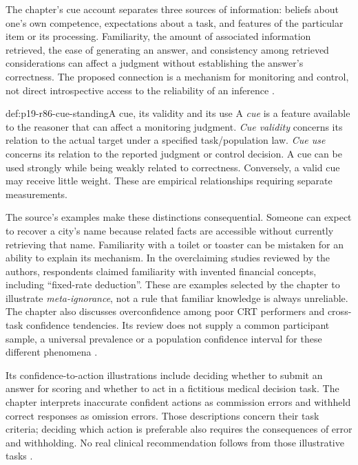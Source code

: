 The chapter's cue account separates three sources of information: beliefs
about one's own competence, expectations about a task, and features of the
particular item or its processing. Familiarity, the amount of associated
information retrieved, the ease of generating an answer, and consistency
among retrieved considerations can affect a judgment without establishing
the answer's correctness. The proposed connection is a mechanism for
monitoring and control, not direct introspective access to the reliability
of an inference \cite[pp.~518--520]{ThompsonElqayamAckerman2021MetaReasoning}.

\begin{hbdefinition}{def:p19-r86-cue-standing}{A cue, its validity and its use}
A \emph{cue} is a feature available to the reasoner that can affect a
monitoring judgment. \emph{Cue validity} concerns its relation to the actual
target under a specified task/population law. \emph{Cue use} concerns its
relation to the reported judgment or control decision. A cue can be used
strongly while being weakly related to correctness. Conversely, a valid cue
may receive little weight. These are empirical relationships requiring
separate measurements.
\end{hbdefinition}

The source's examples make these distinctions consequential. Someone can
expect to recover a city's name because related facts are accessible without
currently retrieving that name. Familiarity with a toilet or toaster can be
mistaken for an ability to explain its mechanism. In the overclaiming studies
reviewed by the authors, respondents claimed familiarity with invented
financial concepts, including ``fixed-rate deduction''. These are examples
selected by the chapter to illustrate
\emph{meta-ignorance}, not a rule that familiar knowledge is always unreliable.
The chapter also discusses overconfidence among poor CRT performers and
cross-task confidence tendencies. Its review does not supply a common
participant sample, a universal prevalence or a population confidence interval
for these different phenomena
\cite[pp.~518--519]{ThompsonElqayamAckerman2021MetaReasoning}.

Its confidence-to-action illustrations include deciding whether to submit an
answer for scoring and whether to act in a fictitious medical decision task.
The chapter interprets inaccurate confident actions as commission errors and
withheld correct responses as omission errors. Those descriptions concern
their task criteria; deciding which action is preferable also requires the
consequences of error and withholding. No real clinical recommendation follows
from those illustrative tasks
\cite[p.~519]{ThompsonElqayamAckerman2021MetaReasoning}.

